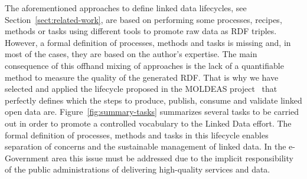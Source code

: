 The aforementioned approaches to define linked data lifecycles, see Section~\ref{sect:related-work}, are based on performing some processes, 
recipes, methods or tasks using different tools to promote raw data as RDF triples. However, a formal definition of processes, 
methods and tasks is missing and, in most of the cases, they are based on the author’s expertise. The main consequence 
of this offhand mixing of approaches is the lack of a quantifiable method to measure the quality of the generated RDF. 
That is why we have selected and applied the lifecycle proposed in the MOLDEAS project~\cite{DBLP:journals/ijseke/AlvarezLSASL12}
that perfectly defines which the steps to produce, publish, consume and validate linked open data are. Figure~\ref{fig:summary-tasks} summarizes several 
tasks to be carried out in order to promote a controlled vocabulary to the Linked Data effort. The formal definition of processes, 
methods and tasks in this lifecycle enables separation of concerns and the sustainable management of linked data. In the e-Government 
area this issue must be addressed due to the implicit responsibility of the public administrations of delivering high-quality services and data.
